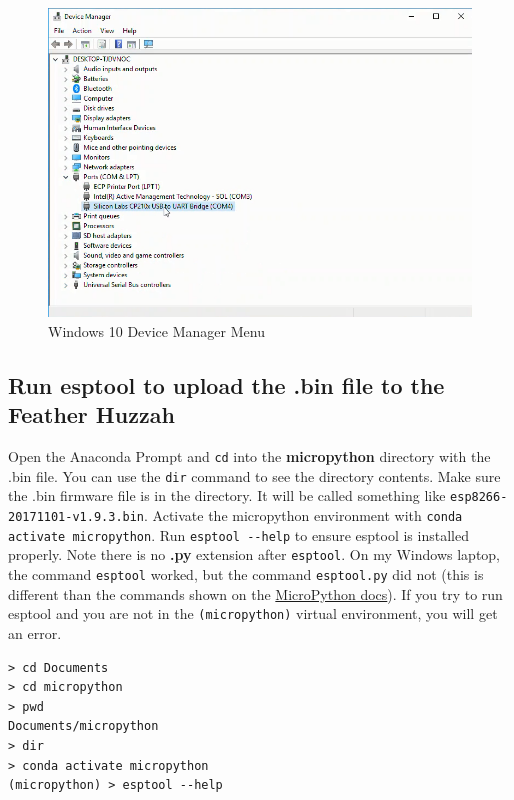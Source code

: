 \documentclass{book}
\makeatletter
\def\maxwidth{\ifdim\Gin@nat@width>\linewidth\linewidth
    \else\Gin@nat@width\fi}
\let\Oldincludegraphics\includegraphics
\renewcommand{\includegraphics}[1]{\Oldincludegraphics[width=.8\maxwidth]{#1}}
\makeatother
\begin{document}
\begin{figure}
\centering
\includegraphics{images/device_manager_menu.png}
\caption{Windows 10 Device Manager Menu}
\end{figure}

    \subsection{Run esptool to upload the .bin file to the Feather
Huzzah}\label{run-esptool-to-upload-the-.bin-file-to-the-feather-huzzah}

    Open the Anaconda Prompt and \lstinline!cd! into the
\textbf{micropython} directory with the .bin file. You can use the
\lstinline!dir! command to see the directory contents. Make sure the
.bin firmware file is in the directory. It will be called something like
\lstinline!esp8266-20171101-v1.9.3.bin!. Activate the micropython
environment with \lstinline!conda activate micropython!. Run
\lstinline!esptool --help! to ensure esptool is installed properly. Note
there is no \textbf{.py} extension after \lstinline!esptool!. On my
Windows laptop, the command \lstinline!esptool! worked, but the command
\lstinline!esptool.py! did not (this is different than the commands
shown on the
\href{https://docs.micropython.org/en/latest/esp8266/esp8266/tutorial/intro.html\#deploying-the-firmware}{MicroPython
docs}). If you try to run esptool and you are not in the
\lstinline!(micropython)! virtual environment, you will get an error.

\begin{lstlisting}
> cd Documents
> cd micropython
> pwd
Documents/micropython
> dir
> conda activate micropython
(micropython) > esptool --help
\end{lstlisting}
\end{document}
